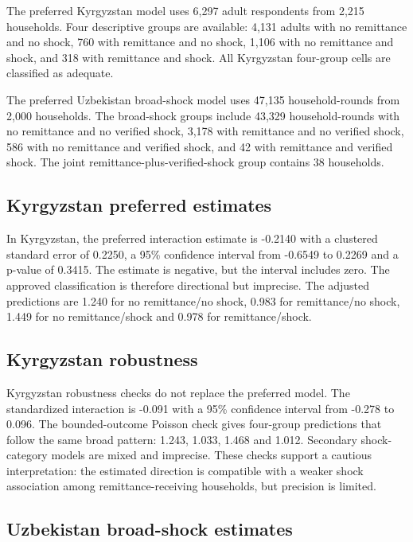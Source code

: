 \documentclass[11pt]{article}
\begin{document}
The preferred Kyrgyzstan model uses 6,297 adult respondents from 2,215 households. Four descriptive groups are available: 4,131 adults with no remittance and no shock, 760 with remittance and no shock, 1,106 with no remittance and shock, and 318 with remittance and shock. All Kyrgyzstan four-group cells are classified as adequate.

The preferred Uzbekistan broad-shock model uses 47,135 household-rounds from 2,000 households. The broad-shock groups include 43,329 household-rounds with no remittance and no verified shock, 3,178 with remittance and no verified shock, 586 with no remittance and verified shock, and 42 with remittance and verified shock. The joint remittance-plus-verified-shock group contains 38 households.

\subsection{Kyrgyzstan preferred estimates}

In Kyrgyzstan, the preferred interaction estimate is -0.2140 with a clustered standard error of 0.2250, a 95\% confidence interval from -0.6549 to 0.2269 and a p-value of 0.3415. The estimate is negative, but the interval includes zero. The approved classification is therefore directional but imprecise. The adjusted predictions are 1.240 for no remittance/no shock, 0.983 for remittance/no shock, 1.449 for no remittance/shock and 0.978 for remittance/shock.

\subsection{Kyrgyzstan robustness}

Kyrgyzstan robustness checks do not replace the preferred model. The standardized interaction is -0.091 with a 95\% confidence interval from -0.278 to 0.096. The bounded-outcome Poisson check gives four-group predictions that follow the same broad pattern: 1.243, 1.033, 1.468 and 1.012. Secondary shock-category models are mixed and imprecise. These checks support a cautious interpretation: the estimated direction is compatible with a weaker shock association among remittance-receiving households, but precision is limited.

\subsection{Uzbekistan broad-shock estimates}
\end{document}

